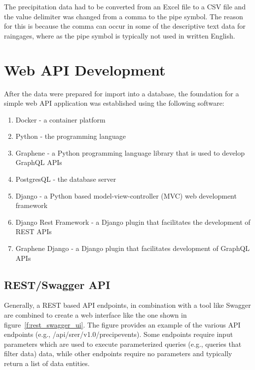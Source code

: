 The precipitation data had to be converted from an Excel file to a CSV file 
and the value delimiter was changed from a comma to the pipe symbol.  The 
reason for this is because the comma can occur in some of the descriptive text 
data for raingages, where as the pipe symbol is typically not used in written 
English.

\section{Web API Development}
After the data were prepared for import into a database, the foundation for a 
simple web API application was established using the following software:

\begin{enumerate}
  \item Docker - a container platform\cite{hid505Docker2018}
  \item Python - the programming language
  \item Graphene - a Python programming language library that is used to 
  develop GraphQL APIs
  \item PostgresQL - the database server
  \item Django - a Python based model-view-controller (MVC) web development 
  framework
  \item Django Rest Framework - a Django plugin that facilitates the 
  development of REST APIs
  \item Graphene Django - a Django plugin that facilitates development of 
  GraphQL APIs
\end{enumerate}

\subsection{REST/Swagger API}
Generally, a REST based API endpoints, in combination with a tool like Swagger 
are combined to create a web interface like the one shown in 
figure~\ref{f:rest_swagger_ui}.  The figure provides an example of the various 
API endpoints (e.g., /api/srer/v1.0/precipevents).  Some endpoints require 
input parameters which are used to execute parameterized queries (e.g., 
queries that filter data) data, while other endpoints require no parameters 
and typically return a list of data entities.

